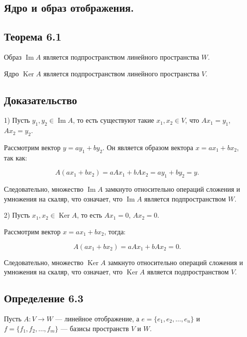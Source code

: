 {
\subsection{Ядро и образ отображения.}

\subsection*{Теорема 6.1}

Образ \( \operatorname{Im} A \) является подпространством линейного пространства \( W \).

Ядро \( \operatorname{Ker} A \) является подпространством линейного пространства \( V \).

\subsection*{Доказательство}

1) Пусть \( y_1, y_2 \in \operatorname{Im} A \), то есть существуют такие \( x_1, x_2 \in V \), что \( A x_1 = y_1 \), \( A x_2 = y_2 \).

Рассмотрим вектор \( y = a y_1 + b y_2 \). Он является образом вектора \( x = a x_1 + b x_2 \), так как:



\[
A (a x_1 + b x_2) = a A x_1 + b A x_2 = a y_1 + b y_2 = y.
\]



Следовательно, множество \( \operatorname{Im} A \) замкнуто относительно операций сложения и умножения на скаляр, что означает, что \( \operatorname{Im} A \) является подпространством \( W \).

2) Пусть \( x_1, x_2 \in \operatorname{Ker} A \), то есть \( A x_1 = 0 \), \( A x_2 = 0 \).

Рассмотрим вектор \( x = a x_1 + b x_2 \), тогда:



\[
A (a x_1 + b x_2) = a A x_1 + b A x_2 = 0.
\]



Следовательно, множество \( \operatorname{Ker} A \) замкнуто относительно операций сложения и умножения на скаляр, что означает, что \( \operatorname{Ker} A \) является подпространством \( V \).

\subsection*{Определение 6.3}

Пусть \( A : V \to W \) — линейное отображение, а \( e = \{e_1, e_2, \dots, e_n\} \) и \( f = \{f_1, f_2, \dots, f_m\} \) — базисы пространств \( V \) и \( W \).

}
